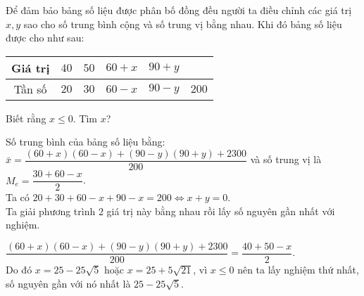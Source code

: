 \begin{bt}%
Để đảm bảo bảng số liệu được phân bố đồng đều người ta  điều chỉnh các giá trị $x,y$ sao cho số trung bình cộng và  số trung vị  bằng nhau. Khi đó bảng số liệu được cho như sau:  
\begin{center}
\begin{tabular}{|c|p{1cm}|p{1cm}|p{1cm}|p{1cm}|c|}
\hline
Giá trị &   \centering $40$    &  \centering $50$    &\centering $60+x$&\centering $90+y$&  \\
\hline
Tần số & \centering $20$&\centering $30$& \centering $60-x$&\centering  $90-y$ &$200$ \\
\hline
\end{tabular}
\end{center}
Biết rằng  $x\le 0$. Tìm $x$? 
\loigiai
{
Số  trung bình của bảng số liệu bằng: $\bar{x}=\dfrac{(60+x)(60-x)+(90-y)(90+y)+2300}{200} $
và số trung vị là $ M_e = \dfrac{30+60-x}{2} $.\\
Ta  có $20 +30+60- x +90 -x =200  \Leftrightarrow x+y=0$.\\Ta giải phương trình $2$ giá trị này bằng nhau rồi lấy số nguyên gần nhất với nghiệm.

$\dfrac{(60+x)(60-x)+(90-y)(90+y)+2300}{200}
=\dfrac{40+50-x}{2}$.\\ 
Do đó
$ x=25-25\sqrt{5} $ hoặc $x=25+5\sqrt{21}$, vì $x\le 0 $ nên ta lấy nghiệm thứ nhất, số nguyên gần với nó nhất là $25-25\sqrt{5}$.
}
\end{bt}

